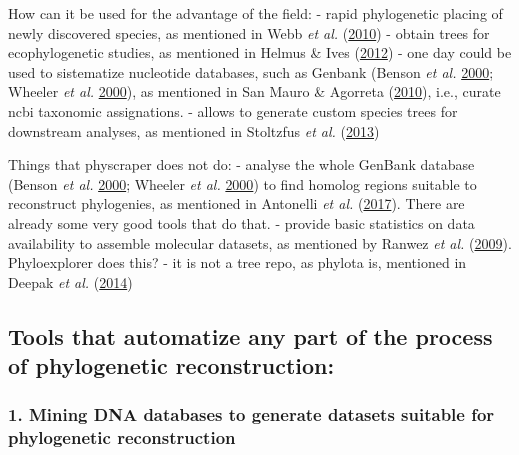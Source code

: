 \documentclass[]{article}
\begin{document}
How can it be used for the advantage of the field:
- rapid phylogenetic placing of newly discovered species, as mentioned in Webb \emph{et al.} (\protect\hyperlink{ref-webb2010biodiversity}{2010})
- obtain trees for ecophylogenetic studies, as mentioned in Helmus \& Ives (\protect\hyperlink{ref-helmus2012phylogenetic}{2012})
- one day could be used to sistematize nucleotide databases, such as Genbank (Benson \emph{et al.} \protect\hyperlink{ref-benson2000genbank}{2000}; Wheeler \emph{et al.} \protect\hyperlink{ref-wheeler2000database}{2000}), as mentioned in San Mauro \& Agorreta (\protect\hyperlink{ref-san2010molecular}{2010}), i.e., curate ncbi taxonomic assignations.
- allows to generate custom species trees for downstream analyses, as mentioned in Stoltzfus \emph{et al.} (\protect\hyperlink{ref-stoltzfus2013phylotastic}{2013})

Things that physcraper does not do:
- analyse the whole GenBank database (Benson \emph{et al.} \protect\hyperlink{ref-benson2000genbank}{2000}; Wheeler \emph{et al.} \protect\hyperlink{ref-wheeler2000database}{2000}) to find homolog regions suitable to reconstruct phylogenies, as mentioned in Antonelli \emph{et al.} (\protect\hyperlink{ref-antonelli2017toward}{2017}). There are already some very good tools that do that.
- provide basic statistics on data availability to assemble molecular datasets, as mentioned by Ranwez \emph{et al.} (\protect\hyperlink{ref-ranwez2009phyloexplorer}{2009}). Phyloexplorer does this?
- it is not a tree repo, as phylota is, mentioned in Deepak \emph{et al.} (\protect\hyperlink{ref-deepak2014evominer}{2014})

\hypertarget{tools-that-automatize-any-part-of-the-process-of-phylogenetic-reconstruction}{%
\subsection{Tools that automatize any part of the process of phylogenetic reconstruction:}\label{tools-that-automatize-any-part-of-the-process-of-phylogenetic-reconstruction}}

\hypertarget{mining-dna-databases-to-generate-datasets-suitable-for-phylogenetic-reconstruction}{%
\subsubsection{1. Mining DNA databases to generate datasets suitable for phylogenetic reconstruction}\label{mining-dna-databases-to-generate-datasets-suitable-for-phylogenetic-reconstruction}}
\end{document}
